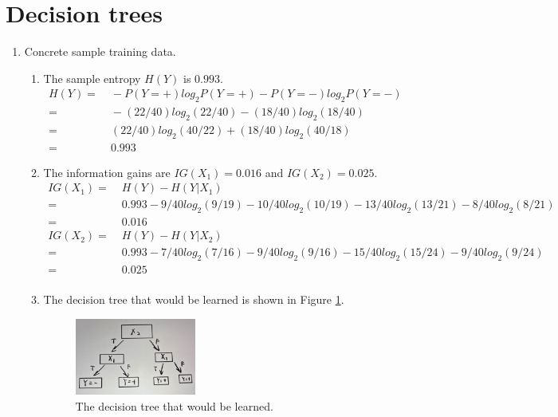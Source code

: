 \section{Decision trees}

\begin{enumerate}
\item Concrete sample training data.
  \begin{enumerate}
  \item The sample entropy $H(Y)$ is $0.993$.
    \begin{align*}
      H(Y) =&\; -P(Y=+) log_2P(Y=+) - P(Y=-) log_2P(Y=-)\\
      =&\; -(22/40)log_2(22/40)-(18/40)log_2(18/40)\\
      =&\; (22/40)log_2(40/22)+(18/40)log_2(40/18)\\
      =&\; 0.993
    \end{align*}

  \item The information gains are $IG(X_1) = 0.016$ and $IG(X_2) = 0.025$.  
    \begin{align*}
      IG(X_1) =&\; H(Y)-H(Y|X_1)\\ =&\;0.993-9/40log_2(9/19)-10/40log_2(10/19)-13/40log_2(13/21)-8/40log_2(8/21)\\
      =&\;0.016\\
      IG(X_2) =&\; H(Y)-H(Y|X_2)\\ =&\;0.993-7/40log_2(7/16)-9/40log_2(9/16)-15/40log_2(15/24)-9/40log_2(9/24)\\
      =&\;0.025\\
    \end{align*}

  \item The decision tree that would be learned is shown in Figure
    \ref{fig:decision_tree}.
    \begin{figure}[H]
      \centering
      \includegraphics[width=0.4\textwidth]{images/decision_tree.png}
      \caption{The decision tree that would be learned.}
      \label{fig:decision_tree}
    \end{figure}
  \end{enumerate}


\end{enumerate}
